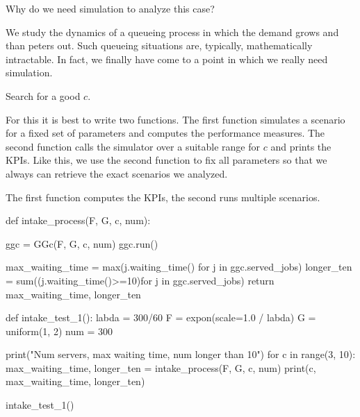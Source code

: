\begin{exercise}
  Why do we need simulation to analyze this case?
  \begin{solution}
    We study the dynamics of a queueing process in which the demand grows and than peters out. Such queueing situations are, typically, mathematically intractable. In fact, we finally have come to a point in which we really need simulation. 
  \end{solution}
\end{exercise}


\begin{exercise}
  Search for a good $c$.

   
   \begin{hint}
  For this it is best to write two functions. The first function simulates a scenario for a fixed set of parameters and computes the performance measures. The second  function calls the simulator over a suitable range for $c$ and prints the KPIs. Like this, we use  the second function to fix all parameters so that we always can retrieve the exact scenarios we analyzed. 
   \end{hint}

  \begin{solution}
The first function computes the KPIs, the second runs multiple scenarios. 

    \begin{pyverbatim}
def intake_process(F, G, c, num):

    ggc = GGc(F, G, c, num)
    ggc.run()

    max_waiting_time = max(j.waiting_time() for j in ggc.served_jobs)
    longer_ten = sum((j.waiting_time()>=10)for j in ggc.served_jobs)
    return max_waiting_time, longer_ten


def intake_test_1():
    labda = 300/60
    F = expon(scale=1.0 / labda)
    G = uniform(1, 2)
    num = 300

    print("Num servers, max waiting time, num longer than 10")
    for c in range(3, 10):
        max_waiting_time, longer_ten = intake_process(F, G, c, num)
        print(c, max_waiting_time, longer_ten)

      
intake_test_1()

    \end{pyverbatim}
  \end{solution}
  
\end{exercise}

